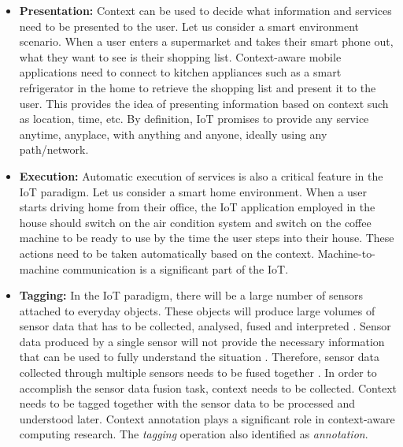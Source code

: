 \documentclass[journal]{IEEEtran}
\begin{document}
 
 

 
 

 
 
 
 
 \begin{itemize}
\item \textbf{Presentation:} Context  can be used to decide what information  and services need to be presented to the user. Let us consider a smart \cite{P007} environment  scenario. When a user enters a supermarket   and takes their smart phone out, what they want to see is their shopping list. Context-aware mobile  applications  need to connect to kitchen appliances  such as a smart refrigerator \cite{P352} in the home to retrieve  the shopping list and present it  to the user. This provides the idea of presenting information  based on context such as location,  time, etc. By definition, IoT promises to provide any service anytime, anyplace, with anything and anyone, ideally using any path/network.

 \item \textbf{Execution:} Automatic execution  of services  is also a critical feature in the IoT paradigm. Let us consider  a smart home  \cite{P007} environment. When a user  starts driving home from their office, the IoT application employed  in  the house should switch  on the air condition system and switch on the coffee machine  to be ready to use  by the time the user  steps into their house. These actions need to be taken automatically  based on the context. Machine-to-machine communication is a significant  part of the IoT.


 \item\textbf{Tagging:} In the IoT paradigm,  there will be a  large number of sensors attached to everyday objects. These objects will produce  large volumes  of sensor  data that has  to be collected, analysed,  fused and interpreted \cite{P109}. Sensor data produced by a  single sensor  will  not provide the necessary information that can be used to fully understand the situation \cite{IA06}.  Therefore,  sensor data collected  through multiple sensors  needs  to be fused together \cite{IA05}.  In order to accomplish the sensor data fusion task, context needs to be collected.  Context needs to be tagged together with the sensor data to be processed and understood later. Context annotation  plays a  significant role in context-aware computing research. The  \textit{tagging} operation also identified as \textit{annotation}. 

 \end{itemize}
 
\end{document}
